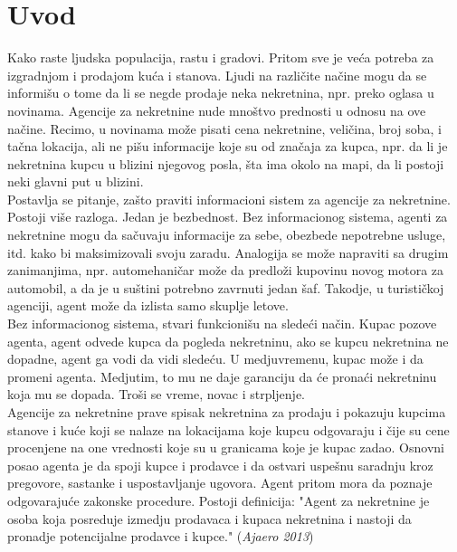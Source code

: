 \documentclass[20pt]{article}
\begin{document}
\newpage
{}
\tableofcontents

\newpage
\section{\bfseries \Large Uvod} 
\setlength{\parindent}{1cm}
\fontsize{13}{18} \selectfont 

\indent Kako raste ljudska populacija, rastu i gradovi. Pritom sve je ve\' ca potreba za izgradnjom i prodajom ku\' ca i stanova. Ljudi na razli\v cite na\v cine mogu da se informi\v su o tome da li se negde prodaje neka nekretnina, npr. preko oglasa u novinama. Agencije za nekretnine nude mno\v stvo prednosti u odnosu na ove na\v cine. Recimo, u novinama mo\v ze pisati cena nekretnine, veli\v cina, broj soba, i ta\v cna lokacija, ali ne pi\v su informacije koje su od zna\v caja za kupca, npr. da li je nekretnina kupcu u blizini njegovog posla, \v sta ima okolo na mapi, da li postoji neki glavni put u blizini.\\



\indent Postavlja se pitanje, za\v sto praviti informacioni sistem za agencije za nekretnine. Postoji vi\v se razloga. Jedan je bezbednost. Bez informacionog sistema, agenti za nekretnine mogu da sa\v cuvaju informacije za sebe,  obezbede nepotrebne usluge, itd. kako bi maksimizovali svoju zaradu. Analogija se mo\v ze napraviti sa drugim zanimanjima, npr. automehani\v car mo\v ze da predlo\v zi kupovinu novog motora za automobil, a da je u su\v stini potrebno zavrnuti jedan \v saf. Takodje, u turisti\v ckoj agenciji, agent mo\v ze da izlista samo skuplje letove.\\

\indent Bez informacionog sistema, stvari funkcioni\v su na slede\' ci na\v cin. Kupac pozove agenta, agent odvede kupca da pogleda nekretninu, ako se kupcu nekretnina ne dopadne, agent ga vodi da vidi slede\' cu. U medjuvremenu, kupac mo\v ze i da promeni agenta. Medjutim, to mu ne daje garanciju da \' ce prona\' ci nekretninu koja mu se dopada. Tro\v si se vreme, novac i strpljenje. \\

\indent Agencije za nekretnine prave spisak nekretnina za prodaju i pokazuju kupcima stanove i ku\' ce koji se nalaze na lokacijama koje kupcu odgovaraju i \v cije su cene procenjene na one vrednosti koje su u granicama koje je kupac zadao. Osnovni posao agenta je da spoji kupce i prodavce i da ostvari uspe\v snu saradnju kroz pregovore, sastanke i uspostavljanje ugovora. Agent pritom mora da poznaje odgovaraju\' ce zakonske procedure. Postoji definicija: "Agent za nekretnine je osoba koja posreduje izmedju prodavaca i kupaca nekretnina i nastoji da pronadje potencijalne prodavce i kupce." ({\it Ajaero 2013})\\
\end{document}

